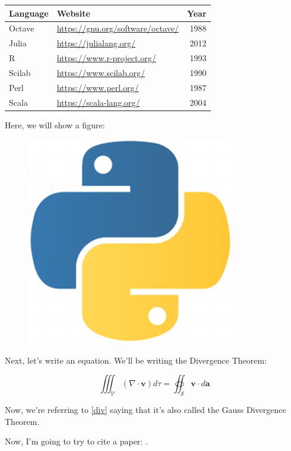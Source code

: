 \documentclass[12pt,a4paper]{article}
\begin{document}
\begin{tabular}{|l|l|r|}
\hline
Language & Website & Year\\
\hline
Octave & \href{https://gnu.org/software/octave/}{https://gnu.org/software/octave/} & 1988\\
Julia & \href{https://julialang.org/}{https://julialang.org/} & 2012\\
R & \href{https://www.r-project.org/}{https://www.r-project.org/} & 1993\\
Scilab & \href{https://www.scilab.org/}{https://www.scilab.org/} & 1990 \\
Perl & \href{https://www.perl.org/}{https://www.perl.org/} & 1987 \\
Scala & \href{https://scala-lang.org/}{https://scala-lang.org/} & 2004\\
\hline
\end{tabular}

Here, we will show a figure:

\begin{figure}[h]
\begin{center}
	\includegraphics[scale=0.1]{python_img}
\end{center}
\end{figure}

Next, let's write an equation. We'll be writing the Divergence Theorem:

\begin{equation}\label{div}
	\iiint_\mathcal{V} (\nabla \cdot \mathbf{v})d\tau = \oiint_\mathcal{S} \mathbf{v} \cdot d\mathbf{a}
\end{equation}

Now, we're referring to \ref{div} saying that it's also called the Gauss Divergence Theorem.

Now, I'm going to try to cite a paper: \cite{phani2005}.



\end{document}
